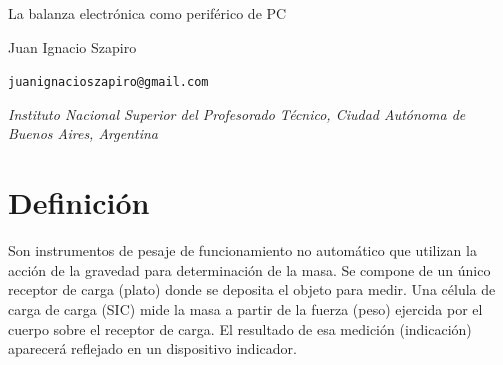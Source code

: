 \documentclass{article}
\renewenvironment{quote}{\list{}{\leftmargin=1cm\rightmargin=0cm}\item\relax}{\endlist}
\begin{document}
    \begin{center}
        {\fontsize{24pt}{24pt}\selectfont La balanza electrónica como periférico de PC} 

        \hspace{1.5cm}
        
        {Juan Ignacio Szapiro}

        \fontsize{9pt}{9pt}\texttt{juanignacioszapiro@gmail.com}

        \fontsize{10pt}{10pt}\textit{Instituto Nacional Superior del Profesorado Técnico, Ciudad Autónoma de Buenos Aires, Argentina}
        
        \hspace{1.5cm}
    \end{center}
    
    \renewcommand{\abstractname}{\vspace{-\baselineskip}}
    \begin{abstract}

    \hspace{1.5cm}
    \end{abstract}
    

    \section{Definición}
        { }
        \begin{quote}
        Son instrumentos de pesaje de funcionamiento no automático que utilizan la acción de la gravedad para determinación de la masa. Se compone de un único receptor de carga (plato) donde se deposita el objeto para medir. Una célula de carga de carga (SIC) mide la masa a partir de la fuerza (peso) ejercida por el cuerpo sobre el receptor de carga. El resultado de
        esa medición (indicación) aparecerá reflejado en un dispositivo indicador.
        \end{quote}
\end{document}
